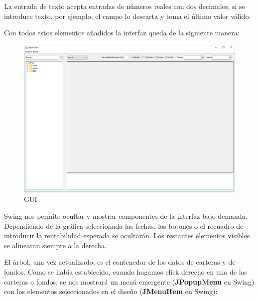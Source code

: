 \documentclass[12pt, a4paper]{book}
\begin{document}
La entrada de texto acepta entradas de números reales con dos decimales, si se introduce texto, por ejemplo, el campo lo descarta y toma el último valor válido.
\newpage

Con todos estos elementos añadidos la interfaz queda de la siguiente manera:

\begin{figure}[htbp]
	\centering
	\includegraphics[width=\textwidth]{figuras/gui2.PNG}
	\caption{GUI}
	\label{fig:gui2}
	\end {figure}

Swing nos permite ocultar y mostrar componentes de la interfaz bajo demanda. Dependiendo de la gráfica seleccionada las fechas, los botones o el recuadro de introducir la rentabilidad esperada se ocultarán. Los restantes elementos visibles se alinearan siempre a la derecha.\\
\newpage

El árbol, una vez actualizado, es el contenedor de los datos de carteras y de fondos. Como se había establecido, cuando hagamos click derecho en una de las carteras o fondos, se nos mostrará un menú emergente (\textbf{JPopupMenu} en Swing) con los elementos seleccionados en el diseño (\textbf{JMenuItem} en Swing):
\end{document}
